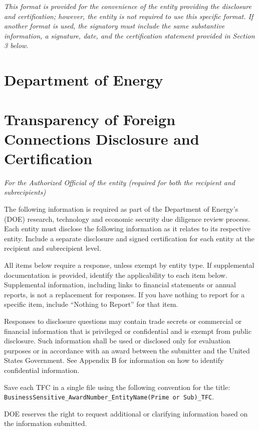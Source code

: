 \documentclass[
]{article}
\author{}
\date{}
\begin{document}
\emph{This format is provided for the convenience of the entity
providing the disclosure and certification; however, the entity is not
required to use this specific format. If another format is used, the
signatory must include the same substantive information, a signature,
date, and the certification statement provided in Section 3 below.}

\section{Department of Energy}\label{department-of-energy}

\section{Transparency of Foreign Connections Disclosure and
Certification}\label{transparency-of-foreign-connections-disclosure-and-certification}

\emph{For the Authorized Official of the entity (required for both the
recipient and subrecipients)}

The following information is required as part of the Department of
Energy's (DOE) research, technology and economic security due diligence
review process. Each entity must disclose the following information as
it relates to its respective entity. Include a separate disclosure and
signed certification for each entity at the recipient and subrecipient
level.

All items below require a response, unless exempt by entity type. If
supplemental documentation is provided, identify the applicability to
each item below. Supplemental information, including links to financial
statements or annual reports, is not a replacement for responses. If you
have nothing to report for a specific item, include ``Nothing to
Report'' for that item.

Responses to disclosure questions may contain trade secrets or
commercial or financial information that is privileged or confidential
and is exempt from public disclosure. Such information shall be used or
disclosed only for evaluation purposes or in accordance with an award
between the submitter and the United States Government. See Appendix B
for information on how to identify confidential information.

Save each TFC in a single file using the following convention for the
title:
\texttt{BusinessSensitive\_AwardNumber\_EntityName(Prime\ or\ Sub)\_TFC}.

DOE reserves the right to request additional or clarifying information
based on the information submitted.
\end{document}
